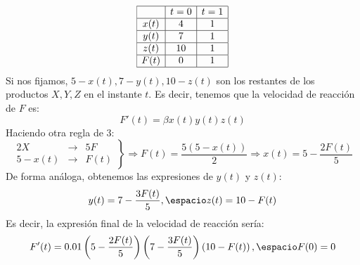 \begin{example}
\[
\begin{array}{|c|c|c|}
\hline
& t=0 & t=1 \\
\hline
x(t) & 4 & 1\\
\hline
y(t) & 7 & 1\\
\hline
z(t) & 10 & 1\\
\hline
F(t) & 0 & 1\\
\hline
\end{array}
\]
Si nos fijamos, $5-x(t),7-y(t),10-z(t)$ son los restantes de los productos $X,Y,Z$ en el instante $t$. Es decir, tenemos que la velocidad de reacción de $F$ es:
\[
F'(t)=\beta x(t)y(t)z(t)
\]
Haciendo otra regla de 3:
\[
\left.
\begin{array}{ccc}
2X & \longrightarrow & 5F\\
5-x(t) & \longrightarrow & F(t)
\end{array}
\right\} \Rightarrow F(t)=\frac{5(5-x(t))}{2} \Rightarrow x(t)=5-\frac{2F(t)}{5}
\]
De forma análoga, obtenemos las expresiones de $y(t)$ y $z(t)$:
\[
y(t)=7-\frac{3F(t)}{5}, \espacio z(t)=10-F(t)
\]
Es decir, la expresión final de la velocidad de reacción sería:
\[
F'(t)=0.01\left(5-\frac{2F(t)}{5}\right)\left(7-\frac{3F(t)}{5}\right)\left(10-F(t)\right), \espacio F(0)=0
\]
\end{example}
